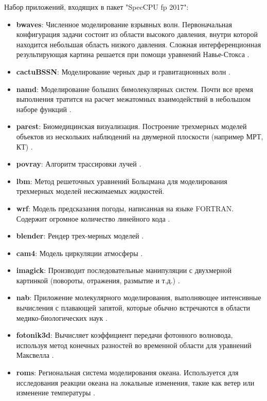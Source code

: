 Набор приложений, входящих в пакет "SpecCPU fp 2017":
\begin{itemize}
	\item  \textbf{bwaves}:  Численное  моделирование взрывных волн. Первоначальная конфигурация задачи состоит из области высокого давления,  внутри которой находится небольшая область низкого давления. Сложная интерференционная  результирующая картина  решается при помощи уравнений Навье-Стокса \cite{auer1983intracranial}.
	\item  \textbf{cactuBSSN}: Моделирование черных дыр и гравитационных волн \cite{allen2007scientific}.
	\item  \textbf{namd}: Моделирование больших бимолекулярных систем. Почти все время выполнения тратится на расчет межатомных взаимодействий в небольшом наборе функций \cite{phillips2002namd}.
	\item  \textbf{parest}: Биомедицинская визуализация. Построение трехмерных моделей объектов из нескольких наблюдений на двумерной плоскости (например МРТ, КТ) \cite{hoon2007fully}.
	\item  \textbf{povray}: Алгоритм трассировки лучей \cite{plachetka1998pov}.
	\item  \textbf{lbm}: Метод решеточных уравнений Больцмана для моделирования трехмерных моделей несжимаемых жидкостей.
	\item  \textbf{wrf}: Модель предсказания погоды, написанная на языке FORTRAN. Содержит огромное количество линейного кода \cite{skamarock2019description}. 
 	\item  \textbf{blender}: Рендер трех-мерных моделей \cite{brito2007blender}. 
 	\item  \textbf{cam4}: Модель циркуляции атмосферы \cite{neale2013mean}. 
 	\item  \textbf{imagick}: Производит последовательные манипуляции с двухмерной картинкой (повороты, отражения, размытие и т.д.) \cite{still2006definitive}. 
 	\item  \textbf{nab}: Приложение молекулярного моделирования, выполняющее интенсивные вычисления с плавающей запятой, которые обычно встречаются в области медико-биологических наук \cite{povcanic2009nab}. 
 	\item  \textbf{fotonik3d}: Вычисляет коэффициент передачи фотонного волновода, используя метод конечных разностей во временной области для уравнений Максвелла \cite{sullivan2013electromagnetic}.
 	\item  \textbf{roms}: Региональная система моделирования океана. Используется для исследования реакции океана на локальные изменения, такие как ветер или изменение температуры \cite{haidvogel2008ocean}. 
\end{itemize}



